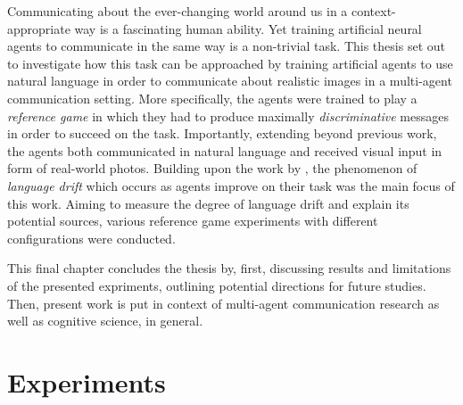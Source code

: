 Communicating about the ever-changing world around us in a context-appropriate way is a fascinating human ability. Yet training artificial neural agents to communicate in the same way is a non-trivial task. This thesis set out to investigate how this task can be approached by training artificial agents to use natural language in order to communicate about realistic images in a multi-agent communication setting. More specifically, the agents were trained to play a \emph{reference game} in which they had to produce maximally \emph{discriminative} messages in order to succeed on the task. Importantly, extending beyond previous work, the agents both communicated in natural language and received visual input in form of real-world photos. Building upon the work by \cite{lazaridou2020multi}, the phenomenon of \emph{language drift} which occurs as agents improve on their task was the main focus of this work. Aiming to measure the degree of language drift and explain its potential sources, various reference game experiments with different configurations were conducted. 

This final chapter concludes the thesis by, first, discussing results and limitations of the presented expriments, outlining potential directions for future studies. Then, present work is put in context of multi-agent communication research as well as cognitive science, in general. 

\section{Experiments}

